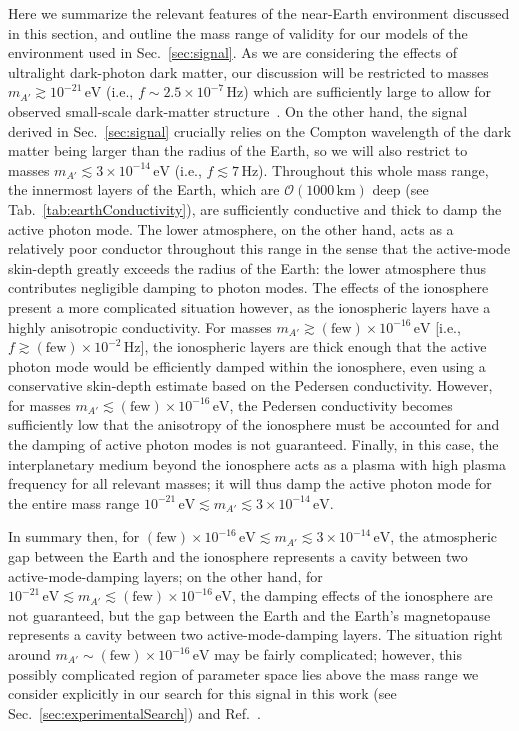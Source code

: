 \documentclass[amsmath,amssymb,aps,10pt,prd,letterpaper,nofootinbib,balancelastpage,notitlepage,superscriptaddress,twocolumn,floatfix]{revtex4-2}
\newcommand{\tabref}[2][]{Tab{#1}.~\ref{#2}}		%
\newcommand{\secref}[2][]{Sec{#1}.~\ref{#2}}		%
\newcommand{\citeR}[2][]{Ref{#1}.~\cite{#2}}		%
\begin{document}
Here we summarize the relevant features of the near-Earth environment discussed in this section, and outline the mass range of validity for our models of the environment used in \secref{sec:signal}.
As we are considering the effects of ultralight dark-photon dark matter, our discussion will be restricted to masses $m_{A'}\gtrsim 10^{-21}\,\text{eV}$ (i.e., $f\sim 2.5 \times 10^{-7}\,$Hz) which are sufficiently large to allow for observed small-scale dark-matter structure~\cite{Hui:2016ltb,Kobayashi:2017jcf,Irsic:2017yje,Nadler:2020prv}.
On the other hand, the signal derived in \secref{sec:signal} crucially relies on the Compton wavelength of the dark matter being larger than the radius of the Earth, so we will also restrict to masses $m_{A'}\lesssim3\times10^{-14}\,\text{eV}$ (i.e., $f\lesssim 7\,$Hz).
Throughout this whole mass range, the innermost layers of the Earth, which are $\mathcal O(1000\,\text{km})$ deep (see \tabref{tab:earthConductivity}), are sufficiently conductive and thick to damp the active photon mode.
The lower atmosphere, on the other hand, acts as a relatively poor conductor throughout this range in the sense that the active-mode skin-depth greatly exceeds the radius of the Earth: the lower atmosphere thus contributes negligible damping to photon modes.
The effects of the ionosphere present a more complicated situation however, as the ionospheric layers have a highly anisotropic conductivity.
For masses $m_{A'}\gtrsim (\text{few}) \times 10^{-16}\,\text{eV}$ [i.e., $f\gtrsim (\text{few}) \times 10^{-2}\,$Hz], the ionospheric layers are thick enough that the active photon mode would be efficiently damped within the ionosphere, even using a conservative skin-depth estimate based on the Pedersen conductivity.
However, for masses $m_{A'}\lesssim (\text{few}) \times 10^{-16}\,\text{eV}$, the Pedersen conductivity becomes sufficiently low that the anisotropy of the ionosphere must be accounted for and the damping of active photon modes is not guaranteed.
Finally, in this case, the interplanetary medium beyond the ionosphere acts as a plasma with high plasma frequency for all relevant masses; it will thus damp the active photon mode for the entire mass range $10^{-21}\,\text{eV}\lesssim m_{A'}\lesssim 3\times10^{-14}\,\text{eV}$.

In summary then, for $(\text{few}) \times 10^{-16}\,\text{eV}\lesssim m_{A'}\lesssim 3\times10^{-14}\,\text{eV}$, the atmospheric gap between the Earth and the ionosphere represents a cavity between two active-mode-damping layers; on the other hand, for $10^{-21}\,\text{eV}\lesssim m_{A'}\lesssim (\text{few}) \times 10^{-16}\,\text{eV}$, the damping effects of the ionosphere are not guaranteed, but the gap between the Earth and the Earth's magnetopause represents a cavity between two active-mode-damping layers.
The situation right around $m_{A'} \sim (\text{few}) \times 10^{-16}\,\text{eV}$ may be fairly complicated; however, this possibly complicated region of parameter space lies above the mass range we consider explicitly in our search for this signal in this work (see \secref{sec:experimentalSearch}) and \citeR{Fedderke:2021qva}.
\end{document}
